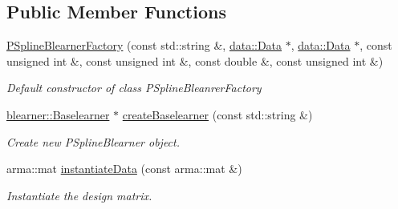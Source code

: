 \subsection*{Public Member Functions}
\begin{DoxyCompactItemize}
\item 
\mbox{\hyperlink{classblearnerfactory_1_1_p_spline_blearner_factory_ac5218d98736f787d4a2cca8faf317470}{P\+Spline\+Blearner\+Factory}} (const std\+::string \&, \mbox{\hyperlink{classdata_1_1_data}{data\+::\+Data}} $\ast$, \mbox{\hyperlink{classdata_1_1_data}{data\+::\+Data}} $\ast$, const unsigned int \&, const unsigned int \&, const double \&, const unsigned int \&)
\begin{DoxyCompactList}\small\item\em Default constructor of class {\ttfamily P\+Spline\+Bleanrer\+Factory} \end{DoxyCompactList}\item 
\mbox{\hyperlink{classblearner_1_1_baselearner}{blearner\+::\+Baselearner}} $\ast$ \mbox{\hyperlink{classblearnerfactory_1_1_p_spline_blearner_factory_a877072332da418456dcbcb27c572c1e7}{create\+Baselearner}} (const std\+::string \&)
\begin{DoxyCompactList}\small\item\em Create new {\ttfamily P\+Spline\+Blearner} object. \end{DoxyCompactList}\item 
arma\+::mat \mbox{\hyperlink{classblearnerfactory_1_1_p_spline_blearner_factory_a290a1c60224d027059939a895b474aa1}{instantiate\+Data}} (const arma\+::mat \&)
\begin{DoxyCompactList}\small\item\em Instantiate the design matrix. \end{DoxyCompactList}\end{DoxyCompactItemize}
